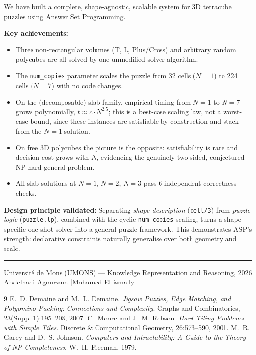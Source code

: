 \documentclass[12pt,a4paper]{article}
\begin{document}
We have built a complete, shape-agnostic, scalable system for 3D tetracube
puzzles using Answer Set Programming.

\textbf{Key achievements:}
\begin{itemize}[leftmargin=1.8em]
  \item Three non-rectangular volumes (T, L, Plus/Cross) and arbitrary random
        polycubes are all solved by one unmodified solver algorithm.
  \item The \texttt{num\_copies} parameter scales the puzzle from 32 cells
        ($N=1$) to 224 cells ($N=7$) with no code changes.
  \item On the (decomposable) slab family, empirical timing from $N=1$ to
        $N=7$ grows polynomially, $t \approx c \cdot N^{2.5}$; this is a
        best-case scaling law, not a worst-case bound, since these instances
        are satisfiable by construction and stack from the $N=1$ solution.
  \item On free 3D polycubes the picture is the opposite: satisfiability is
        rare and decision cost grows with $N$, evidencing the genuinely
        two-sided, conjectured-NP-hard general problem.
  \item All slab solutions at $N=1$, $N=2$, $N=3$ pass 6 independent
        correctness checks.
\end{itemize}

\textbf{Design principle validated:}
Separating \emph{shape description} (\texttt{cell/3}) from \emph{puzzle logic}
(\texttt{puzzle.lp}), combined with the cyclic \texttt{num\_copies} scaling,
turns a shape-specific one-shot solver into a general puzzle framework.
This demonstrates ASP's strength: declarative constraints naturally
generalise over both geometry and scale.

\vspace{1cm}
\noindent\textcolor{umons-blue!60}{\rule{\linewidth}{1.5pt}}
\begin{center}
  \small\color{gray}
  Université de Mons (UMONS) --- Knowledge Representation and Reasoning, 2026\\
  Abdelhadi Agourzam \quad|\quad Mohamed El ismaily\\[2pt]
\end{center}

\begin{thebibliography}{9}
  E.~D. Demaine and M.~L. Demaine.
  \emph{Jigsaw Puzzles, Edge Matching, and Polyomino Packing: Connections and
  Complexity}.
  Graphs and Combinatorics, 23(Suppl 1):195--208, 2007.
  C.~Moore and J.~M. Robson.
  \emph{Hard Tiling Problems with Simple Tiles}.
  Discrete \& Computational Geometry, 26:573--590, 2001.
  M.~R. Garey and D.~S. Johnson.
  \emph{Computers and Intractability: A Guide to the Theory of
  NP-Completeness}.
  W.~H. Freeman, 1979.
\end{thebibliography}
\end{document}
